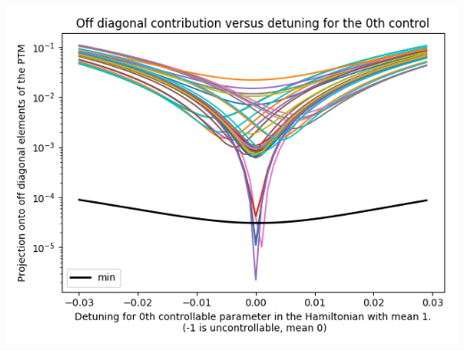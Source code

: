 \documentclass{article}
\begin{document}
\begin{center}
\includegraphics[scale=.9]{off_diag_1}

\end{center}
\end{document}
